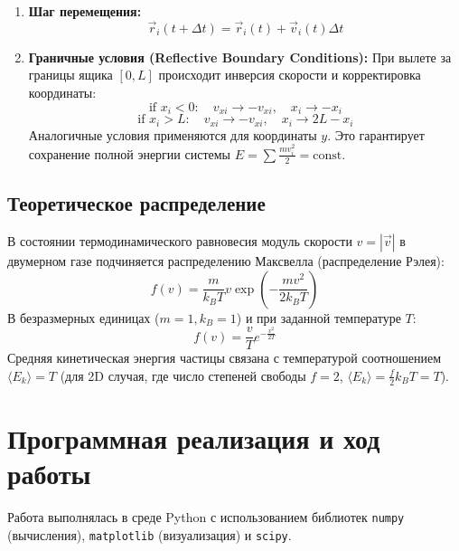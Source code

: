 \documentclass[12pt, a4paper]{article}
\begin{document}
	\begin{enumerate}
		\item \textbf{Шаг перемещения:}
		\begin{equation}
			\vec{r}_i(t + \Delta t) = \vec{r}_i(t) + \vec{v}_i(t) \Delta t
		\end{equation}
		
		\item \textbf{Граничные условия (Reflective Boundary Conditions):}
		При вылете за границы ящика $[0, L]$ происходит инверсия скорости и корректировка координаты:
		\begin{equation}
			\text{if } x_i < 0: \quad v_{xi} \to -v_{xi}, \quad x_i \to -x_i
		\end{equation}
		\begin{equation}
			\text{if } x_i > L: \quad v_{xi} \to -v_{xi}, \quad x_i \to 2L - x_i
		\end{equation}
		Аналогичные условия применяются для координаты $y$. Это гарантирует сохранение полной энергии системы $E = \sum \frac{mv_i^2}{2} = \text{const}$.
	\end{enumerate}
	
	\subsection{Теоретическое распределение}
	В состоянии термодинамического равновесия модуль скорости $v = |\vec{v}|$ в двумерном газе подчиняется распределению Максвелла (распределение Рэлея):
	\begin{equation}
		f(v) = \frac{m}{k_B T} v \exp\left( -\frac{m v^2}{2 k_B T} \right)
	\end{equation}
	В безразмерных единицах ($m=1, k_B=1$) и при заданной температуре $T$:
	\begin{equation}
		f(v) = \frac{v}{T} e^{-\frac{v^2}{2T}}
	\end{equation}
	Средняя кинетическая энергия частицы связана с температурой соотношением $\langle E_k \rangle = T$ (для 2D случая, где число степеней свободы $f=2$, $\langle E_k \rangle = \frac{f}{2}k_B T = T$).
	
	\section{Программная реализация и ход работы}
	
	Работа выполнялась в среде Python с использованием библиотек \texttt{numpy} (вычисления), \texttt{matplotlib} (визуализация) и \texttt{scipy}.
	
\end{document}
